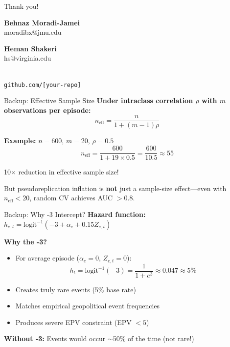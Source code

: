 \documentclass[aspectratio=169]{beamer}
\begin{document}
\begin{frame}[standout]
\begin{center}
\LARGE
Thank you!

\vspace{2em}
\normalsize
\textbf{Behnaz Moradi-Jamei}\\
moradibx@jmu.edu

\vspace{0.5em}
\textbf{Heman Shakeri}\\
hs@virginia.edu

\vspace{2em}
\\
\texttt{github.com/[your-repo]}
\end{center}
\end{frame}

\appendix

\begin{frame}[allowframebreaks]{Backup: Effective Sample Size}
\textbf{Under intraclass correlation $\rho$ with $m$ observations per episode:}
\[n_{\text{eff}} = \frac{n}{1 + (m-1)\rho}\]

\vspace{1em}
\textbf{Example:} $n = 600$, $m = 20$, $\rho = 0.5$
\[n_{\text{eff}} = \frac{600}{1 + 19 \times 0.5} = \frac{600}{10.5} \approx 55\]

\vspace{1em}
\alert{10× reduction in effective sample size!}

\vspace{1em}
But pseudoreplication inflation is \textbf{not} just a sample-size effect—even with $n_{\text{eff}} < 20$, random CV achieves AUC $> 0.8$.
\end{frame}

\begin{frame}[allowframebreaks]{Backup: Why -3 Intercept?}
\textbf{Hazard function:} $h_{e,t} = \text{logit}^{-1}(-3 + \alpha_e + 0.15 Z_{e,t})$

\vspace{0.5em}
\textbf{Why the -3?}
\begin{itemize}
\item For average episode ($\alpha_e = 0$, $Z_{e,t} = 0$):
\[h_t = \text{logit}^{-1}(-3) = \frac{1}{1 + e^3} \approx 0.047 \approx 5\%\]

\item Creates \alert{truly rare events} (5\% base rate)
\item Matches empirical geopolitical event frequencies
\item Produces severe EPV constraint (EPV $< 5$)
\end{itemize}

\vspace{0.5em}
\textbf{Without -3:} Events would occur $\sim$50\% of the time (not rare!)
\end{frame}
\end{document}

